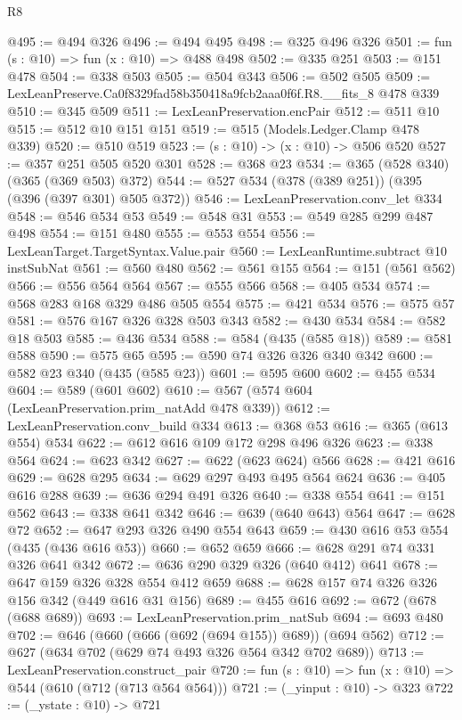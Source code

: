\begin{lexlean}{R8}
\begin{coremodule}
@495 := @494 @326
@496 := @494 @495
@498 := @325 @496 @326
@501 := fun (s : @10) => fun (x : @10) => @488 @498
@502 := @335 @251
@503 := @151 @478
@504 := @338 @503
@505 := @504 @343
@506 := @502 @505
@509 := LexLeanPreserve.Ca0f8329fad58b350418a9fcb2aaa0f6f.R8.__fits_8 @478 @339
@510 := @345 @509
@511 := LexLeanPreservation.encPair
@512 := @511 @10
@515 := @512 @10 @151 @151
@519 := @515 (Models.Ledger.Clamp @478 @339)
@520 := @510 @519
@523 := (s : @10) -> (x : @10) -> @506 @520
@527 := @357 @251 @505 @520 @301
@528 := @368 @23
@534 := @365 (@528 @340) (@365 (@369 @503) @372)
@544 := @527 @534 (@378 (@389 @251)) (@395 (@396 (@397 @301) @505 @372))
@546 := LexLeanPreservation.conv_let @334
@548 := @546 @534 @53
@549 := @548 @31
@553 := @549 @285 @299 @487 @498
@554 := @151 @480
@555 := @553 @554
@556 := LexLeanTarget.TargetSyntax.Value.pair
@560 := LexLeanRuntime.subtract @10 instSubNat
@561 := @560 @480
@562 := @561 @155
@564 := @151 (@561 @562)
@566 := @556 @564 @564
@567 := @555 @566
@568 := @405 @534
@574 := @568 @283 @168 @329 @486 @505 @554
@575 := @421 @534
@576 := @575 @57
@581 := @576 @167 @326 @328 @503 @343
@582 := @430 @534
@584 := @582 @18 @503
@585 := @436 @534
@588 := @584 (@435 (@585 @18))
@589 := @581 @588
@590 := @575 @65
@595 := @590 @74 @326 @326 @340 @342
@600 := @582 @23 @340 (@435 (@585 @23))
@601 := @595 @600
@602 := @455 @534
@604 := @589 (@601 @602)
@610 := @567 (@574 @604 (LexLeanPreservation.prim_natAdd @478 @339))
@612 := LexLeanPreservation.conv_build @334
@613 := @368 @53
@616 := @365 (@613 @554) @534
@622 := @612 @616 @109 @172 @298 @496 @326
@623 := @338 @564
@624 := @623 @342
@627 := @622 (@623 @624) @566
@628 := @421 @616
@629 := @628 @295
@634 := @629 @297 @493 @495 @564 @624
@636 := @405 @616 @288
@639 := @636 @294 @491 @326
@640 := @338 @554
@641 := @151 @562
@643 := @338 @641 @342
@646 := @639 (@640 @643) @564
@647 := @628 @72
@652 := @647 @293 @326 @490 @554 @643
@659 := @430 @616 @53 @554 (@435 (@436 @616 @53))
@660 := @652 @659
@666 := @628 @291 @74 @331 @326 @641 @342
@672 := @636 @290 @329 @326 (@640 @412) @641
@678 := @647 @159 @326 @328 @554 @412 @659
@688 := @628 @157 @74 @326 @326 @156 @342 (@449 @616 @31 @156)
@689 := @455 @616
@692 := @672 (@678 (@688 @689))
@693 := LexLeanPreservation.prim_natSub
@694 := @693 @480
@702 := @646 (@660 (@666 (@692 (@694 @155)) @689)) (@694 @562)
@712 := @627 (@634 @702 (@629 @74 @493 @326 @564 @342 @702 @689))
@713 := LexLeanPreservation.construct_pair
@720 := fun (s : @10) => fun (x : @10) => @544 (@610 (@712 (@713 @564 @564)))
@721 := (_yinput : @10) -> @323
@722 := (_ystate : @10) -> @721

\end{coremodule}
\end{lexlean}

